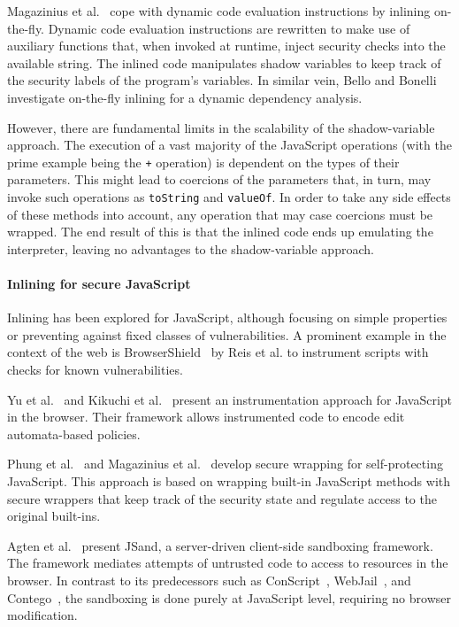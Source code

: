 \documentclass{llncs}
\begin{document}
Magazinius et
al.~\cite{Magazinius+:SEC10,DBLP:journals/compsec/MagaziniusRS12} 
cope with dynamic code evaluation instructions by inlining
on-the-fly. 
Dynamic code evaluation instructions are
rewritten to make use of auxiliary functions that, when invoked at
runtime, inject security checks into the available string. 
The inlined code manipulates shadow variables to keep track of the
security labels of the program's variables. In similar vein,
Bello and Bonelli~\cite{DBLP:conf/ifip1-7/BelloB11} investigate
on-the-fly inlining for a dynamic dependency analysis.

However, there are fundamental limits in the scalability of the shadow-variable
approach.  The execution of a vast majority of the JavaScript operations (with
the prime example being the \lstinline{+} operation) is dependent on the types
of their parameters.  This might lead to coercions of the parameters that, in
turn, may invoke such operations as \lstinline{toString} and \lstinline{valueOf}. In order to take
any side effects of these methods into account, any operation that may case
coercions must be wrapped. The end result of this is that the inlined code ends
up emulating the interpreter, leaving no advantages to the shadow-variable
approach.

\vspace{-.4cm}
\paragraph{Inlining for secure JavaScript}
Inlining has been explored for JavaScript, although focusing on
simple properties or preventing against fixed classes of vulnerabilities.
A prominent example in the context of the web is
BrowserShield~\cite{Reis+:TWeb07} by Reis et al. to instrument scripts with
checks for known vulnerabilities.

Yu et al.~\cite{Yu+:POPL07} and Kikuchi et
al.~\cite{DBLP:conf/aplas/2008} present an instrumentation approach
for JavaScript in the browser. Their framework allows instrumented
code to encode edit automata-based policies.

Phung et al.~\cite{DBLP:conf/ccs/PhungSC09} and 
Magazinius et al.~\cite{DBLP:conf/nordsec/MagaziniusPS10} develop
secure wrapping for self-protecting JavaScript. This approach is based
on wrapping built-in JavaScript methods with secure wrappers that
keep track of the security state and regulate access to the original built-ins.  



Agten et al.~\cite{DBLP:conf/acsac/AgtenABPDP12} present JSand, a
server-driven client-side sandboxing framework. The framework mediates
attempts of untrusted code to access to resources in the browser.  
In contrast to its predecessors such as
ConScript~\cite{DBLP:conf/sp/MeyerovichL10}, WebJail~\cite{DBLP:conf/acsac/AckerRDPJ11}, and Contego~\cite{DBLP:conf/trust/LuoD11},
the sandboxing is done purely at JavaScript level, requiring no
browser modification.
\end{document}
